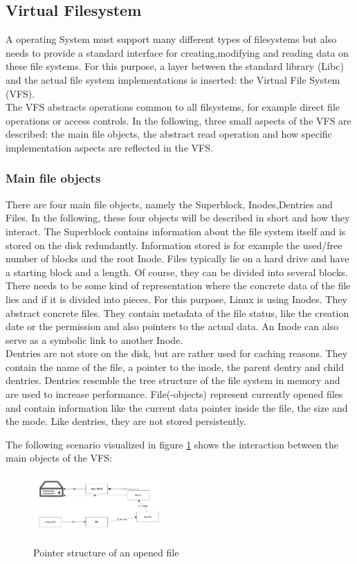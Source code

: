 \documentclass{sig-alternate-05-2015}
\begin{document}
\subsection{Virtual Filesystem}
A operating System must support many different types of filesystems but also needs to provide a standard interface for creating,modifying and reading data on these file systems. For this purpose, a layer between the standard library (Libc) and the actual file system implementations is inserted: the Virtual File System (VFS). \\
The VFS abstracts  operations common to all filsystems, for example direct file operations or access controls. In the following, three small aspects of the VFS are described: the main file objects, the abstract read operation and how specific implementation aspects are reflected in the VFS.
\subsubsection{Main file objects }
There are four main file objects, namely the Superblock, Inodes,Dentries and Files. In the following, these four objects will be described in short and how they interact. 
The Superblock contains information about the file system itself and is stored on the disk redundantly. Information stored is  for example  the used/free number of blocks and the root Inode.
Files typically lie on a hard drive and have a starting block and a length. Of course, they can be divided into several blocks. There needs to be some kind of representation where the concrete data of the file lies and if it is divided into pieces. For this purpose, Linux is using Inodes. They abstract concrete files. They contain metadata of the file status, like the creation date or the permission and also pointers to the actual data. An Inode can also serve as a symbolic link to another Inode.\\
Dentries are not store on the disk, but are rather used for caching reasons. They contain the name of the file, a pointer to the inode, the parent dentry and child dentries. Dentries resemble the tree structure of the file system in memory and are used to increase performance.
File(-objects) represent currently opened files and contain information like the current data pointer inside the file, the size and the mode. Like dentries, they are not stored persistently.\par
The following scenario visualized in figure \ref{fig:vfs-bsp} shows the interaction between the main objects of the VFS:
\begin{figure}[h]
\centering
\includegraphics[width= 0.45\textwidth ]{img/vfs-bsp.pdf}
\label{fig:vfs-bsp}
\caption{Pointer structure of an opened file}
\end{figure}
\end{document}

